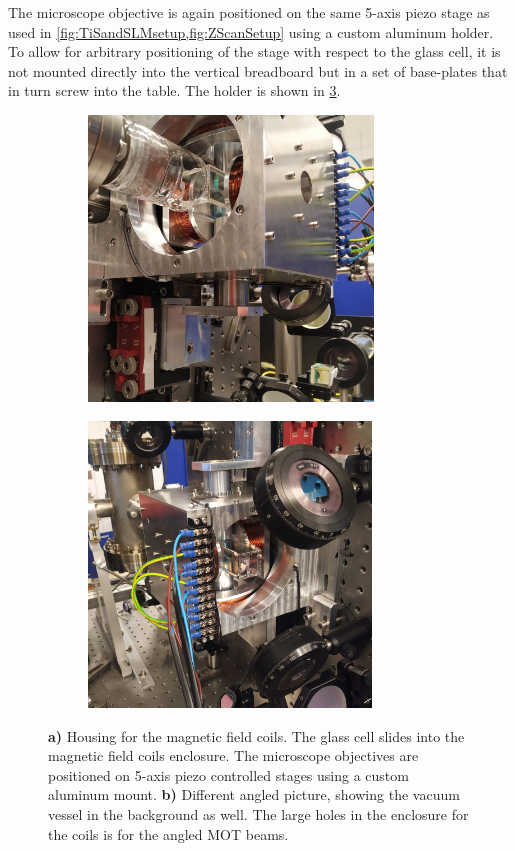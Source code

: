 The microscope objective is again positioned on the same 5-axis piezo stage as used in \cref{fig:TiSandSLMsetup,fig:ZScanSetup} using a custom aluminum holder.
To allow for arbitrary positioning of the stage with respect to the glass cell, it is not mounted directly into the vertical breadboard but in a set of base-plates that in turn screw into the table.
The holder is shown in \cref{fig:Coils}.
\begin{figure}
	\begin{subfigure}{.49\linewidth}
		\flushleft
		\includegraphics[height=7.6cm]{figures/CoilsCropped.jpg}
		\caption{}
		\label{fig:Coils1}
	\end{subfigure}
	\hfill
	\begin{subfigure}{.49\linewidth}
		\flushright
		\includegraphics[height=7.6cm]{figures/CoilsCropped2.jpg}
		\caption{}
		\label{fig:Coils2}
	\end{subfigure}
	\caption{
	\textsf{\textbf{a)}} Housing for the magnetic field coils. 
	The glass cell slides into the magnetic field coils enclosure.
    The microscope objectives are positioned on 5-axis piezo controlled stages using a custom aluminum mount. 
    \textsf{\textbf{b)}} Different angled picture, showing the vacuum vessel in the background as well. 
    The large holes in the enclosure for the coils is for the angled MOT beams.
    }
    \label{fig:Coils}
\end{figure}
